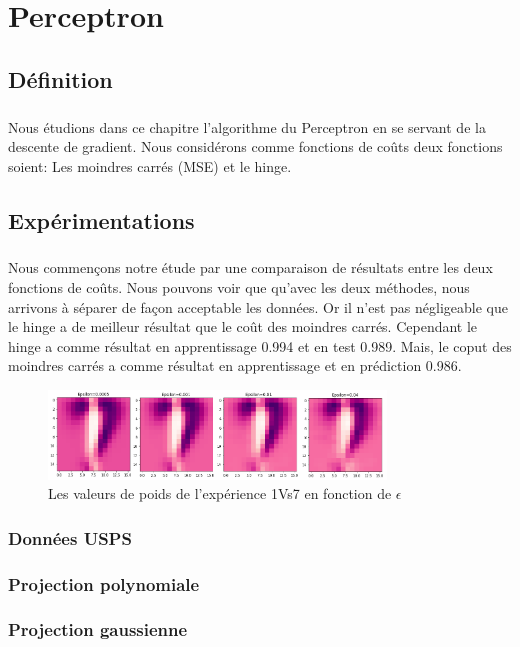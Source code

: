 \documentclass{report}
\begin{document}
\chapter{Perceptron}
\section{Définition}
\paragraph{}
Nous étudions dans ce chapitre l'algorithme du Perceptron en se servant de la descente de gradient. Nous considérons comme fonctions de coûts deux fonctions soient: Les moindres carrés (MSE) et le hinge.
\section{Expérimentations}
\paragraph{}
Nous commençons notre étude par une comparaison de résultats entre les deux fonctions de coûts. Nous pouvons voir que qu'avec les deux méthodes, nous arrivons à séparer de façon acceptable les données. Or il n'est pas négligeable que le hinge a de meilleur résultat que le coût des moindres carrés. Cependant le hinge a comme résultat en apprentissage 0.994 et en test 0.989. Mais, le coput des moindres carrés a comme résultat en apprentissage et en prédiction 0.986.
 \begin{figure}[H]
	\begin{center}
		\includegraphics[width=0.8\textwidth]{reg_log.png}
		\caption{Les valeurs de poids de l'expérience 1Vs7 en fonction de  $\epsilon$}
	\end{center}
\end{figure}
\subsection{Données USPS}
\subsection{Projection polynomiale}
\subsection{Projection gaussienne}
\end{document}
